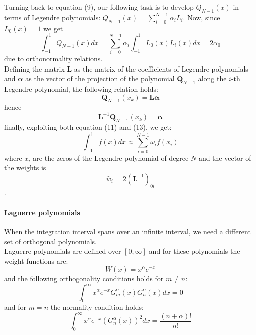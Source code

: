 \documentclass[10pt,a4paper,titlepage]{article}
\begin{document}
Turning back to equation (9), our following task is to develop $Q_{N-1}(x)$ in terms of Legendre polynomials: $Q_{N-1}(x) = \sum_{i=0}^{N-1}\alpha_{i}L_{i}$. Now, since $L_0(x)=1$ we get 
\begin{equation}
\int_{-1}^{1}Q_{N-1}(x)dx=\sum_{i=0}^{N-1}\alpha_{i}\int_{-1}^{1}L_{0}(x)L_{i}(x)dx=2\alpha_{0}
\end{equation}
due to orthonormality relations.
\\Defining the matrix $\textbf{L}$ as the matrix of the coefficients of Legendre polynomials and $\boldsymbol\alpha$ as the vector of the projection of the polynomial $\textbf{Q} _{N-1}$ along the $i$-th Legendre polynomial, the following relation holds:
\begin{equation}
\textbf{Q} _{N-1}(x_{k})=\textbf{L}\boldsymbol\alpha
\end{equation}
hence
\begin{equation}
\textbf{L} ^{-1}\textbf{Q} _{N-1}(x_{k})=\boldsymbol\alpha
\end{equation}
finally, exploiting both equation (11) and (13), we get:
\begin{equation}
\int_{-1}^{1}f(x)dx\approx \sum_{i=0}^{N-1}\omega_{i}f(x_{i})
\end{equation}
where $x_{i}$ are the zeros of the Legendre polynomial of degree $N$ and the vector of the weights is $$\tilde{w_i}=2(\textbf{L}^{-1})_{0i}$$. 
\paragraph{Laguerre polynomials} When the integration interval spans over an infinite interval, we need a different set of orthogonal polynomials. 
\\Laguerre polynomials are defined over $[0,\infty]$ and for these polynomials the weight functions are:
\begin{equation} 
W(x)= x^\alpha e^{-x}
\end{equation}
and the following orthogonality conditions holds for $m\neq n$:
\begin{equation}
\int_{0}^{\infty} x^\alpha e^{-x} G_{m}^\alpha(x)G_{n}^\alpha(x)dx=0
\end{equation}
and for $m=n$ the normality condition holds:
\begin{equation}
\int_{0}^{\infty} x^\alpha e^{-x} (G_{n}^\alpha(x))^2 dx=\frac{(n+\alpha)!}{n!}
\end{equation}
\end{document}

